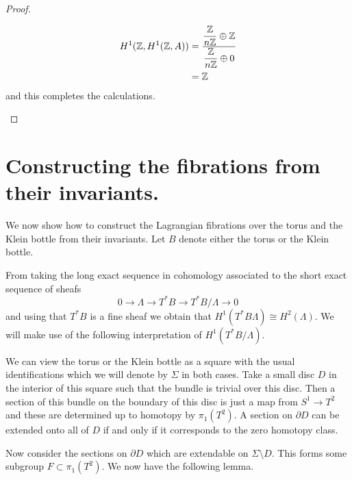 \begin{proof}
\begin{case}[Family 4]
        \begin{align*}
            H^1(\mathbb{Z}, H^1(\mathbb{Z}, A)) & = \dfrac{\dfrac{\mathbb{Z}}{n\mathbb{Z}} \oplus \mathbb{Z}}{\dfrac{\mathbb{Z}}{n\mathbb{Z}} \oplus 0} \\
                                & = \mathbb{Z}
        \end{align*}
        and this completes the calculations. \qedhere
    \end{case}
\end{proof}

\section{Constructing the fibrations from their invariants.}\label{sec:construct}
We now show how to construct the Lagrangian fibrations over the torus and the
Klein bottle from their invariants. Let $B$ denote either the torus or the
Klein bottle.

From taking the long exact sequence in cohomology associated to the short exact
sequence of sheafs $$ 0 \to \Lambda \to T^*B \to T^*B/ \Lambda \to 0 $$ and
using that $T^*B$ is a fine sheaf we obtain that $H^1(T^*B\Lambda) \cong
    H^2(\Lambda)$. We will make use of the following interpretation of
$H^1(T^*B/\Lambda)$.

We can view the torus or the Klein bottle as a square with the usual
identifications which we will denote by $\Sigma$ in both cases. Take a small
disc $D$ in the interior of this square such that the bundle is trivial over
this disc. Then a section of this bundle on the boundary of this disc is just a
map from $S^1 \to T^2$ and these are determined up to homotopy by $\pi_1(T^2)$.
A section on $\partial D$ can be extended onto all of $D$ if and only if it
corresponds to the zero homotopy class.

Now consider the sections on $\partial D$ which are extendable on $\Sigma
    \setminus D$. This forms some subgroup $F \subset \pi_1(T^2)$. We now have the
following lemma.

